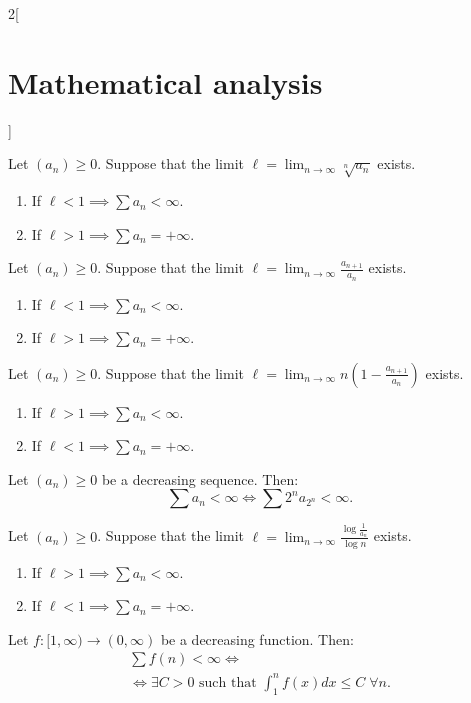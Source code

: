 \documentclass[class=article,crop=false]{standalone}
\begin{document}
\begin{multicols}{2}[\section{Mathematical analysis}]
\begin{theorem}
\begin{enumerate}
\end{enumerate}
\end{theorem}
\begin{theorem}
Let $(a_n)\geq 0$. Suppose that the limit $\displaystyle \ell=\lim_{n\to\infty}\sqrt[n]{a_n}$ exists.
\begin{enumerate}
    \item If $\ell<1\implies\sum a_n<\infty$.
    \item If $\ell>1\implies\sum a_n=+\infty$.
\end{enumerate}
\end{theorem}
\begin{theorem}
Let $(a_n)\geq 0$. Suppose that the limit $\displaystyle \ell=\lim_{n\to\infty}\frac{a_{n+1}}{a_n}$ exists.
\begin{enumerate}
    \item If $\ell<1\implies\sum a_n<\infty$.
    \item If $\ell>1\implies\sum a_n=+\infty$.
\end{enumerate}
\end{theorem}
\begin{theorem}
Let $(a_n)\geq 0$. Suppose that the limit $\displaystyle \ell=\lim_{n\to\infty}n\left(1-\frac{a_{n+1}}{a_n}\right)$ exists.
\begin{enumerate}
    \item If $\ell>1\implies\sum a_n<\infty$.
    \item If $\ell<1\implies\sum a_n=+\infty$.
\end{enumerate}
\end{theorem}
\begin{theorem}
Let $(a_n)\geq 0$ be a decreasing sequence. Then: $$\textstyle\sum a_n<\infty\iff\sum 2^na_{2^n}<\infty.$$
\end{theorem}
\begin{theorem}
Let $(a_n)\geq 0$. Suppose that the limit $\displaystyle \ell=\lim_{n\to\infty}\frac{\log\frac{1}{a_n}}{\log n}$ exists.
\begin{enumerate}
    \item If $\ell>1\implies\sum a_n<\infty$.
    \item If $\ell<1\implies\sum a_n=+\infty$.
\end{enumerate}
\end{theorem}
\begin{theorem}\label{MA-inttest}
Let $f:[1,\infty)\rightarrow(0,\infty)$ be a decreasing function. Then:
\begin{multline*}
    \textstyle\sum f(n)<\infty\iff\\\displaystyle\iff\exists C>0\text{ such that }\int_1^nf(x)dx\leq C\;\forall n.
\end{multline*}
\end{theorem}

\end{multicols}
\end{document}

